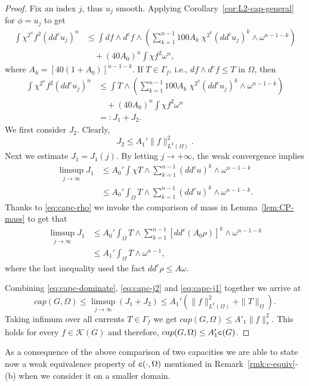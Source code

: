 \documentclass{amsart}
\newcommand{\om}{\omega}
\newcommand{\tc}{{\tt c}}
\newcommand{\Ga}{\Gamma}
\newcommand{\Om}{\Omega}
\newcommand{\cali}[1]{\mathscr{#1}}
\newcommand{\Kc}{\cali{K}}
\theoremstyle{definition}
\numberwithin{thm}{section}
\numberwithin{equation}{section}
\renewcommand{\[}{\begin{equation}}
\renewcommand{\]}{\end{equation}}
\newcommand{\wed}{\wedge}
\begin{document}
\begin{proof}
Fix an index $j$, thus $u_j$ smooth. Applying Corollary~\ref{cor:L2-cap-general} for $\phi = u_j$ to get
$$\begin{aligned}
	\int \chi^{2^{n}} f^2 (dd^cu_j)^n &\leq \int df \wed d^c f \wed \left( \sum_{k=1}^{n-1} 100A_k \;\chi^{2^{k}}  (dd^c u_j)^{k} \wed \om^{n-1-k} \right) \\ &\quad + (40A_0)^n \int \chi f^2 \om^n,
\end{aligned}$$
where $A_k =[40(1+ A_0)]^{n-1-k}$. 
If $T \in \Ga_f$, i.e., $d f \wed d^c f \leq T$ in $\Om$, then 
$$\begin{aligned}
	\int \chi^{2^{n}} f^2 (dd^cu_j)^n &\leq \int T \wed \left( \sum_{k=1}^{n-1} 100A_k \;\chi^{2^{k}}  (dd^c u_j)^{k} \wed \om^{n-1-k} \right) \\ &\quad + (40A_0)^n \int \chi f^2 \om^n \\
	&=: J_1 + J_2.
\end{aligned}$$
We first consider $J_2$. Clearly, 
\[\label{eq:capc-j2}
	J_2
 \leq A_1' \|f\|_{L^2(\Om)}^2.
\]
Next we estimate $J_1 = J_1 (j)$. 
  By letting $j\to +\infty$, the weak convergence  implies
$$\begin{aligned}
	\limsup_{j\to\infty} J_1 &\leq A_0'\int\chi T \wed \sum_{k=1}^{n-1} (dd^cu)^{k}\wed\om^{n-1-k} \\&\leq A_0'\int_\Om T\wed \sum_{k=1}^{n-1} (dd^cu)^{k}\wed \om^{n-1-k}.
\end{aligned}$$
Thanks to \eqref{eq:capc-rho} we invoke the comparison of mass in Lemma~\ref{lem:CP-mass} to get that
 \[\label{eq:capc-j1} \begin{aligned}
\limsup_{j\to \infty} J_1
&\leq A_0' \int_{\Om}  T \wed \sum_{k=1}^{n-1} [dd^c(A_0\rho)]^{k} \wed \om^{n-1-k}\\ 
&\leq A_1'  \int_\Om T\wed \om^{n-1},
  \end{aligned}\]
where the last inequality used the fact $dd^c \rho \leq A \om$.

Combining \eqref{eq:capc-dominate}, \eqref{eq:capc-j2} and \eqref{eq:capc-j1}  together  we arrive at
$$
	 cap(G,\Om) \leq \limsup_{j\to \infty} (J_1+J_2) \leq A_1' ( \|f\|^2_{L^2(\Om)} +  \|T\|_\Om).
$$
Taking infimum over all currents $T\in \Ga_f$ we get
$
	cap(G,\Om) \leq A'_1 \| f\|_*^2.
$
This holds for every $f\in \Kc(G)$ and therefore, $cap(G,\Om) \leq A_1' \tc (G)$.
\end{proof}

As a consequence of the above comparison of two capacities 
we are able to state now a weak equivalence property of $\tc (\cdot, \Om)$ mentioned in Remark~\ref{rmk:c-equiv}-(b) when we consider it on a smaller domain.
\end{document}
